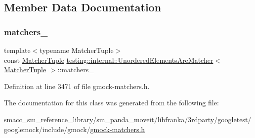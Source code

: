 \subsection{Member Data Documentation}
\mbox{\label{classtesting_1_1internal_1_1UnorderedElementsAreMatcher_acfcd56f88943d922d7e7ecd8d9c5eb9f}} 
\subsubsection{\texorpdfstring{matchers\+\_\+}{matchers\_}}
{\footnotesize\ttfamily template$<$typename Matcher\+Tuple$>$ \\
const \hyperlink{structtesting_1_1internal_1_1MatcherTuple}{Matcher\+Tuple} \hyperlink{classtesting_1_1internal_1_1UnorderedElementsAreMatcher}{testing\+::internal\+::\+Unordered\+Elements\+Are\+Matcher}$<$ \hyperlink{structtesting_1_1internal_1_1MatcherTuple}{Matcher\+Tuple} $>$\+::matchers\+\_\+\hspace{0.3cm}{\ttfamily [private]}}



Definition at line 3471 of file gmock-\/matchers.\+h.



The documentation for this class was generated from the following file\+:\begin{DoxyCompactItemize}
\item 
smacc\+\_\+sm\+\_\+reference\+\_\+library/sm\+\_\+panda\+\_\+moveit/libfranka/3rdparty/googletest/googlemock/include/gmock/\hyperlink{gmock-matchers_8h}{gmock-\/matchers.\+h}\end{DoxyCompactItemize}
